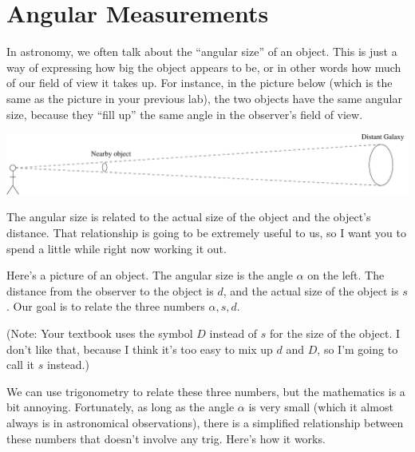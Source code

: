 \section{Angular Measurements}

\makelabheader %

\bigskip

In astronomy, we often talk about the ``angular size'' of an object.
This is just a way of expressing how big the object appears to be, or
in other words how much of our field of view it takes up.  For
instance, in the picture below (which is the same as the picture in
your previous lab), the two objects have the same angular size,
because they ``fill up'' the same angle in the observer's
field of view.

\vspace{0.4in}
\centerline{\includegraphics[width=\textwidth]{localdistance/localdistance1.pdf}}
\vspace{0.4in}

The angular size is related to the actual size of the object and the
object's distance.  That relationship is going to be extremely useful
to us, so I want you to spend a little while right now working it out.

Here's a picture of an object.  The angular size is the angle $\alpha$
on the left.  The distance from the observer to the object is $d$, and
the actual size of the object is $s$.  Our goal is to relate the
three numbers $\alpha,s,d$.

\vspace{0.4in}
\vspace{0.4in}

(Note: Your textbook uses the symbol $D$ instead of $s$ for
the size of the object.  I don't like that, because I think it's
too easy to mix up $d$ and $D$, so I'm going to call it $s$ instead.)

We can use trigonometry to relate these three numbers, but the
mathematics is a bit annoying.  Fortunately, as long as the angle
$\alpha$ is very small (which it almost always is
in astronomical observations), there is a simplified
relationship between these numbers that doesn't involve
any trig.  Here's how it works.

